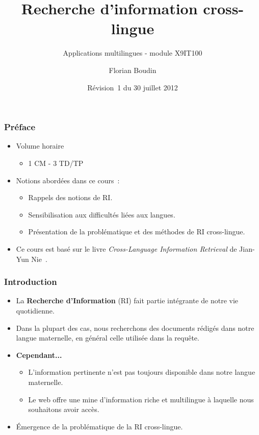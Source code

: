 \documentclass[12pt,aspectratio=43,dvipsnames,table]{beamer}
\title{Recherche d'information cross-lingue}
\subtitle{Applications multilingues - module X9IT100}
\author{Florian Boudin}
\institute{Département informatique, Université de Nantes}
\date[30 juillet 2013 / Rév.~1]{Révision~1 du 30 juillet 2012}
\begin{document}
\frame[plain]{\titlepage}


\begin{frame}
    \frametitle{Préface}
    \begin{itemize} \itemsep10pt
        \item Volume horaire
        \begin{itemize}
            \item 1 CM - 3 TD/TP
        \end{itemize}
        \item Notions abordées dans ce cours~:
        \begin{itemize}
            \item Rappels des notions de RI.
            \item Sensibilisation aux difficultés liées aux langues.
            \item Présentation de la problématique et des méthodes de RI 
                  cross-lingue.
        \end{itemize}
        \item Ce cours est basé sur le livre \textit{Cross-Language Information 
              Retrieval} de Jian-Yun Nie~\cite{DBLP:series/synthesis/2010Nie}.
    \end{itemize}
\end{frame}


\begin{frame}
    \frametitle{Introduction}
    \begin{itemize} \itemsep10pt
        \item La \textbf{Recherche d'Information} (RI) fait partie intégrante de
              notre vie quotidienne.
        \item Dans la plupart des cas, nous recherchons des documents rédigés 
              dans notre langue maternelle, en général celle utilisée dans la 
              requête.
        \item \textbf{Cependant...}
        \begin{itemize}
            \item L'information pertinente n'est pas toujours disponible dans 
                  notre langue maternelle.
            \item Le web offre une mine d'information riche et multilingue à 
                  laquelle nous souhaitons avoir accès.
        \end{itemize}
        \item \'Emergence de la problématique de la RI cross-lingue.
    \end{itemize}
\end{frame}
\end{document}
